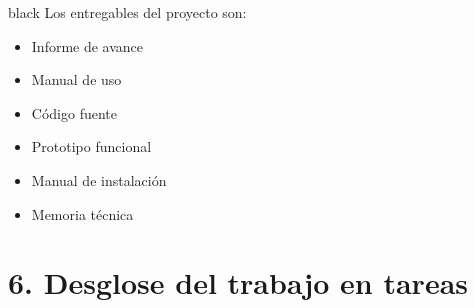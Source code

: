 \documentclass[11pt]{charter}
\begin{document}
\begin{consigna}{black}
Los entregables del proyecto son:

\begin{itemize}
\item Informe de avance
\item Manual de uso
\item Código fuente
\item Prototipo funcional
\item Manual de instalación
\item Memoria técnica

\end{itemize}

\end{consigna}

\section{6. Desglose del trabajo en tareas}
\label{sec:wbs}
\end{document}
